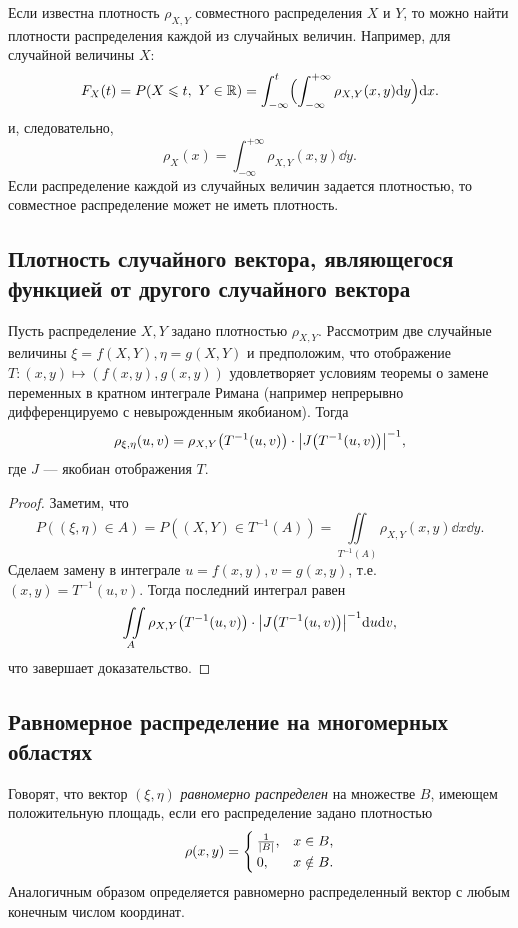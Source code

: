 Если известна плотность $\rho_{X, Y}$ совместного распределения $X$ и $Y$, то можно найти плотности распределения каждой из случайных величин.
Например, для случайной величины $X$:
\[
    F_X(t) = P(X \leqslant t,~Y \in \mathbb{R}) = \int_{-\infty}^t \Bigl( \int_{-\infty}^{+\infty} \rho_{X, Y}(x, y) \dd y \Bigr) \dd x.
\]
и, следовательно,
\[
    \rho_{X}(x) = \int_{-\infty}^{+\infty} \rho_{X, Y}(x, y) \dd y.
\]
Если распределение каждой из случайных величин задается плотностью, то совместное распределение
может не иметь плотность.

\sectionbreak
\subsection{Плотность случайного вектора, являющегося функцией от другого случайного вектора}

\begin{theorem}
    Пусть распределение $X, Y$ задано плотностью $\rho_{X, Y}$.
    Рассмотрим две случайные величины $\xi = f(X, Y), \eta = g(X, Y)$ и предположим, что отображение $T \colon (x,y) \mapsto (f(x,y), g(x,y))$ удовлетворяет условиям теоремы о замене переменных в кратном интеграле Римана (например непрерывно дифференцируемо с невырожденным якобианом).
    Тогда
    \[
        \rho_{\xi, \eta}(u, v) = \rho_{X, Y} \bigl( T^{-1}(u, v) \bigr) \cdot \abs{J \bigl( T^{-1}(u, v) \bigr)}^{-1},
    \]
    где $J$ --- якобиан отображения $T$.
\end{theorem}

\begin{proof}
    Заметим, что
    \[
        P((\xi, \eta) \in A) = P((X, Y) \in T^{-1}(A)) = \iint\limits_{T^{-1}(A)} \rho_{X, Y}(x, y) \dd x \dd y.
    \]
    Сделаем замену в интеграле $u = f(x, y), v = g(x, y)$, т.е. $(x, y) = T^{-1}(u, v)$.
    Тогда последний интеграл равен
    \[
        \iint\limits_{A} \rho_{X, Y}\bigl(T^{-1}(u, v)\bigr) \cdot \abs{J \bigl( T^{-1}(u, v) \bigr)}^{-1} \dd u \dd v,
    \]
    что завершает доказательство.
\end{proof}

\sectionbreak
\subsection{Равномерное распределение на многомерных областях}

Говорят, что вектор $(\xi, \eta)$ {\it равномерно распределен} на множестве $B$, имеющем положительную площадь, если его распределение задано плотностью
\[
    \rho(x, y) = \begin{cases}
        \frac{1}{\abs{B}}, & x \in B, \\
        0, & x \notin B.
    \end{cases}
\]
Аналогичным образом определяется равномерно распределенный вектор с любым конечным числом координат.
